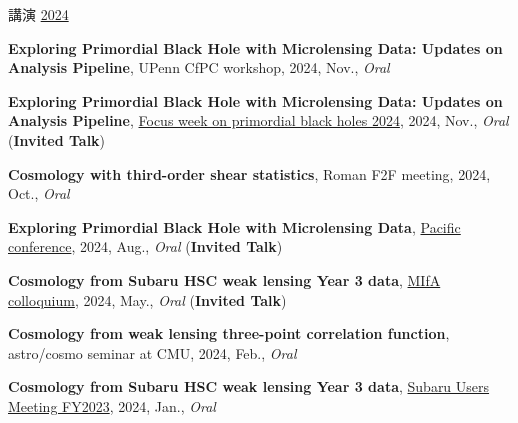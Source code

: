 \begin{rSection}{講演}
\underline{2024}
\begin{etaremune}
\setcounter{enumi}{42}
\item \textbf{Exploring Primordial Black Hole with Microlensing Data: Updates on Analysis Pipeline}, UPenn CfPC workshop, 2024, Nov., \textit{Oral}
\item \textbf{Exploring Primordial Black Hole with Microlensing Data: Updates on Analysis Pipeline}, \href{https://indico.ipmu.jp/event/439/overview}{Focus week on primordial black holes 2024}, 2024, Nov., \textit{Oral} (\textbf{Invited Talk})
\item \textbf{Cosmology with third-order shear statistics}, Roman F2F meeting, 2024, Oct., \textit{Oral}
\item \textbf{Exploring Primordial Black Hole with Microlensing Data}, \href{https://pacific-conference.pa.ucla.edu/index.html}{Pacific conference}, 2024, Aug., \textit{Oral} (\textbf{Invited Talk})
\item \textbf{Cosmology from Subaru HSC weak lensing Year 3 data}, \href{https://cse.umn.edu/physics/minnesota-institute-astrophysics-mifa-colloquium}{MIfA colloquium}, 2024, May., \textit{Oral} (\textbf{Invited Talk})
\item \textbf{Cosmology from weak lensing three-point correlation function}, astro/cosmo seminar at CMU, 2024, Feb., \textit{Oral}
\item \textbf{Cosmology from Subaru HSC weak lensing Year 3 data}, \href{https://www.subarutelescope.org/Science/SubaruUM/SubaruUM2023/index.html}{Subaru Users Meeting FY2023}, 2024, Jan., \textit{Oral}
\end{etaremune}


\end{rSection}
